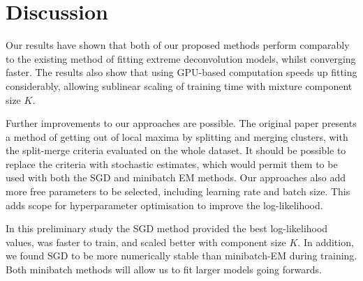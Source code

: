 \section{Discussion}

Our results have shown that both of our proposed methods perform comparably to the existing method of fitting extreme deconvolution models, whilst converging faster.
The results also show that using GPU-based computation speeds up fitting considerably, allowing sublinear scaling of training time with mixture component size $K$. 

Further improvements to our approaches are possible.
The original paper presents a method of getting out of local maxima by splitting and merging clusters, with the split-merge criteria evaluated on the whole dataset.
It should be possible to replace the criteria with stochastic estimates, which would permit them to be used with both the SGD and minibatch EM methods.
Our approaches also add more free parameters to be selected, including learning rate and batch size.
This adds scope for hyperparameter optimisation to improve the log-likelihood.

In this preliminary study the SGD method provided the best log-likelihood values, was faster to train, and scaled better with component size $K$.
In addition, we found SGD to be more numerically stable than minibatch-EM during training.
Both minibatch methods will allow us to fit larger models going forwards.
